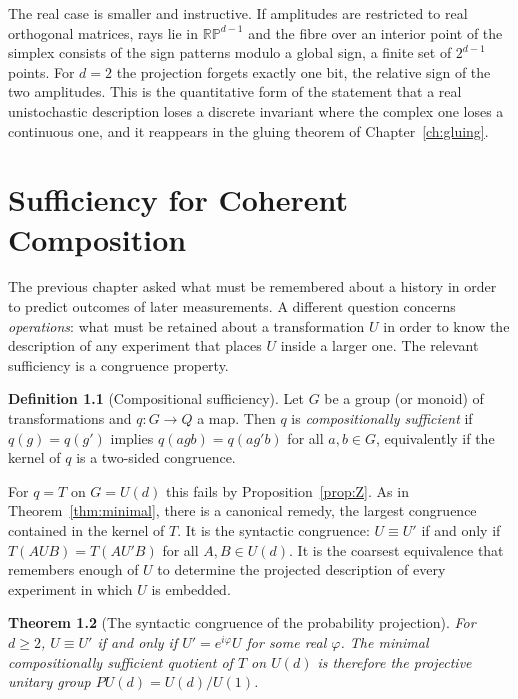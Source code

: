 \documentclass[11pt,oneside]{book}
\newtheorem{theorem}{Theorem}[chapter]
\theoremstyle{definition}
\newtheorem{definition}[theorem]{Definition}
\theoremstyle{remark}
\begin{document}
The real case is smaller and instructive. If amplitudes are restricted to real orthogonal matrices, rays lie in $\mathbb{RP}^{d-1}$ and the fibre over an interior point of the simplex consists of the sign patterns modulo a global sign, a finite set of $2^{d-1}$ points. For $d=2$ the projection forgets exactly one bit, the relative sign of the two amplitudes. This is the quantitative form of the statement that a real unistochastic description loses a discrete invariant where the complex one loses a continuous one, and it reappears in the gluing theorem of Chapter~\ref{ch:gluing}.

\chapter{Sufficiency for Coherent Composition}\label{ch:compositional}

The previous chapter asked what must be remembered about a history in order to predict outcomes of later measurements. A different question concerns \emph{operations}: what must be retained about a transformation $U$ in order to know the description of any experiment that places $U$ inside a larger one. The relevant sufficiency is a congruence property.

\begin{definition}[Compositional sufficiency]
Let $G$ be a group (or monoid) of transformations and $q\colon G\to Q$ a map. Then $q$ is \emph{compositionally sufficient} if $q(g)=q(g')$ implies $q(agb)=q(ag'b)$ for all $a,b\in G$, equivalently if the kernel of $q$ is a two-sided congruence.
\end{definition}

For $q=T$ on $G=U(d)$ this fails by Proposition~\ref{prop:Z}. As in Theorem~\ref{thm:minimal}, there is a canonical remedy, the largest congruence contained in the kernel of $T$. It is the syntactic congruence: $U\equiv U'$ if and only if $T(AUB)=T(AU'B)$ for all $A,B\in U(d)$. It is the coarsest equivalence that remembers enough of $U$ to determine the projected description of every experiment in which $U$ is embedded.

\begin{theorem}[The syntactic congruence of the probability projection]\label{thm:syntactic}
For $d\ge2$, $U\equiv U'$ if and only if $U'=e^{i\varphi}U$ for some real $\varphi$. The minimal compositionally sufficient quotient of $T$ on $U(d)$ is therefore the projective unitary group $PU(d)=U(d)/U(1)$.
\end{theorem}
\end{document}
